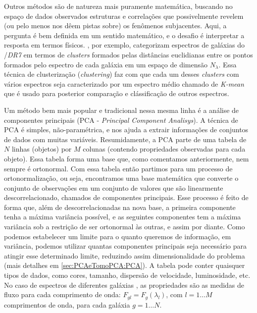 Outros métodos são de natureza mais puramente matemática, buscando no espaço de dados observados estruturas e
correlações que possivelmente revelem (ou pelo menos nos dêem pistas sobre) os fenômenos subjacentes. Aqui, a pergunta é
bem definida em um sentido matemático, e o desafio é interpretar a resposta em termos físicos.
\citet{SanchezAlmeida2010}, por exemplo, categorizam espectros de galáxias do \SDSS/{\em DR7} em termos de {\em
clusters} formados pelas distâncias euclidianas entre os pontos formados pelo espectro de cada galáxia em um espaço de dimensão
$N_\lambda$. Essa técnica de clusterização ({\em clustering}) faz com que cada um desses {\em clusters} com vários
espectros seja caracterizado por um espectro médio chamado de {\em K-mean} que é usado para posterior comparação e
clássificação de outros espectros.

Um método bem mais popular e tradicional nessa mesma linha é a análise de componentes principais (PCA - {\em Principal
Component Analisys}). A técnica de PCA é simples, não-paramétrica, e nos ajuda a extrair informações de conjuntos de
dados com muitas variáveis. Resumidamente, a PCA parte de uma tabela de $N$ linhas (objetos) por $M$ colunas (contendo
propriedades observadas para cada objeto). Essa tabela forma uma base que, como comentamos anteriormente, nem sempre é
ortonormal. Com essa tabela então partimos para um processo de ortonormalização, ou seja, encontramos uma base
matemática que converte o conjunto de observações em um conjunto de valores que são linearmente descorrelacionado,
chamados de componentes principais. Esse processo é feito de forma que, além de descorrelacionadas na nova base, a
primeira componente tenha a máxima variância possível, e as seguintes componentes tem a máxima variância sob a restrição
de ser ortonormal às outras, e assim por diante. Como podemos estabelecer um limite para o quanto queremos de
informação, em variância, podemos utilizar quantas componentes principais seja necessário para atingir esse determinado
limite, reduzindo assim dimensionalidade do problema (mais detalhes em \ref{sec:PCAeTomoPCA:PCA}). A tabela pode conter
quaisquer tipos de dados, como cores, tamanho, dispersão de velocidade, luminosidade, etc. No caso de espectros de
diferentes galáxias \citep[e.g., ][]{Francis1992, Sodre1994, Sodre1997}, as propriedades são as medidas de fluxo para
cada comprimento de onda: $F_{gl} = F_g(\lambda_l)$, com $l = 1 \ldots M$ comprimentos de onda, para cada galáxia $g = 1
\ldots N$.

